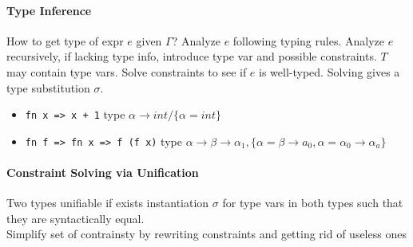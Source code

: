 \paragraph{Type Inference} How to get type of expr $e$ given $\Gamma$?
Analyze $e$ following typing rules. Analyze $e$ recursively, if
lacking type info, introduce type var and possible constraints. $T$
may contain type vars. Solve constraints to see if $e$ is
well-typed. Solving gives a type substitution $\sigma$.
\begin{itemize}
  \setlength\itemsep{-0.5 em}
\item \texttt{fn x => x + 1} type $\alpha \rightarrow int/\{\alpha =
  int\}$
\item \texttt{fn f => fn x => f (f x)} type $\alpha \rightarrow \beta
  \rightarrow \alpha_1, \{\alpha = \beta \rightarrow a_0, \alpha =
  \alpha_0 \rightarrow \alpha_a\}$
\end{itemize}
\vspace{-1 em}
\paragraph{Constraint Solving via Unification} Two types unifiable if
exists instantiation $\sigma$ for type vars in both types such that
they are syntactically equal.
\\ Simplify set of contrainsty by rewriting constraints and getting
rid of useless ones
